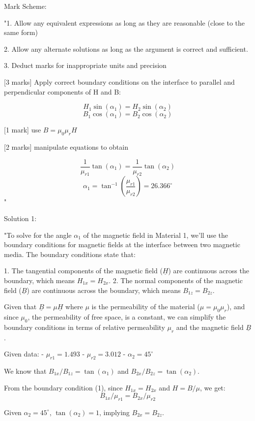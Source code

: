 Mark Scheme:

"1. Allow any equivalent expressions as long as they are reasonable (close to the same form)

2. Allow any alternate solutions as long as the argument is correct and sufficient. 

3. Deduct marks for inappropriate units and precision

[3 marks] Apply correct boundary conditions on the interface to parallel and perpendicular components of H and B:

\[ H_1 \sin(\alpha_1) = H_2 \sin(\alpha_2) \]
\[ B_1 \cos(\alpha_1) = B_2 \cos(\alpha_2) \]

[1 mark] use \( B = \mu_0 \mu_r H \)

[2 marks] manipulate equations to obtain 

\[ \frac{1}{\mu_{r1}} \tan(\alpha_1) = \frac{1}{\mu_{r2}} \tan(\alpha_2) \]
\[ \alpha_1 = \tan^{-1}\left ( \frac{\mu_{r1}}{\mu_{r2}} \right ) = 26.366^{\circ} \]
"

Solution 1:

"To solve for the angle \( \alpha_{1} \) of the magnetic field in Material 1, we'll use the boundary conditions for magnetic fields at the interface between two magnetic media. The boundary conditions state that:

1. The tangential components of the magnetic field (\( \underline{H} \)) are continuous across the boundary, which means \( H_{1x} = H_{2x} \).
2. The normal components of the magnetic field (\( \underline{B} \)) are continuous across the boundary, which means \( B_{1z} = B_{2z} \).

Given that \( \underline{B} = \mu \underline{H} \) where \( \mu \) is the permeability of the material (\( \mu = \mu_0 \mu_r \)), and since \( \mu_0 \), the permeability of free space, is a constant, we can simplify the boundary conditions in terms of relative permeability \( \mu_r \) and the magnetic field \( \underline{B} \).

Given data:
- \( \mu_{r1} = 1.493 \)
- \( \mu_{r2} = 3.012 \)
- \( \alpha_{2} = 45^\circ \)

We know that \( B_{1x}/B_{1z} = \tan(\alpha_{1}) \) and \( B_{2x}/B_{2z} = \tan(\alpha_{2}) \).

From the boundary condition (1), since \( H_{1x} = H_{2x} \) and \( H = B/\mu \), we get:
\[ B_{1x}/\mu_{r1} = B_{2x}/\mu_{r2} \]

Given \( \alpha_{2} = 45^\circ \), \( \tan(\alpha_{2}) = 1 \), implying \( B_{2x} = B_{2z} \).

